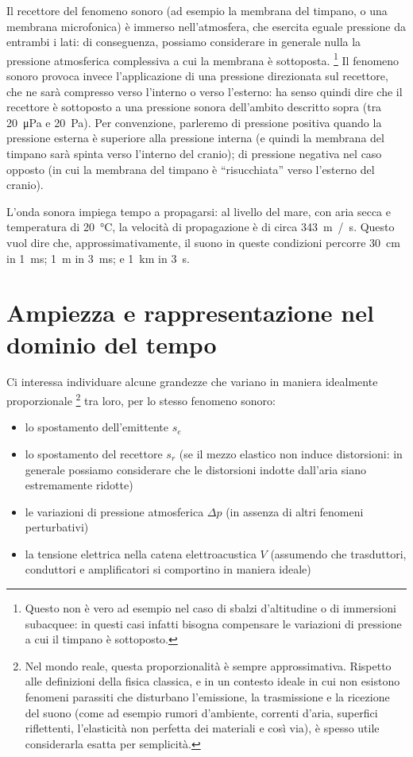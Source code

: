 Il recettore del fenomeno sonoro (ad esempio la membrana del timpano, o una membrana microfonica) è immerso nell'atmosfera, che esercita eguale pressione da entrambi i lati: di conseguenza, possiamo considerare in generale nulla la pressione atmosferica complessiva a cui la membrana è sottoposta.%
\footnote{Questo non è vero ad esempio nel caso di sbalzi d'altitudine o di immersioni subacquee: in questi casi infatti bisogna compensare le variazioni di pressione a cui il timpano è sottoposto.}
Il fenomeno sonoro provoca invece l'applicazione di una pressione direzionata sul recettore, che ne sarà compresso verso l'interno o verso l'esterno: ha senso quindi dire che il recettore è sottoposto a una pressione sonora dell'ambito descritto sopra (tra \qty{20}{\micro\pascal} e \qty{20}{\pascal}). Per convenzione, parleremo di pressione positiva quando la pressione esterna è superiore alla pressione interna (e quindi la membrana del timpano sarà spinta verso l'interno del cranio); di pressione negativa nel caso opposto (in cui la membrana del timpano è ``risucchiata'' verso l'esterno del cranio).

L'onda sonora impiega tempo a propagarsi: al livello del mare, con aria secca e temperatura di \qty{20}{\celsius}, la velocità di propagazione è di circa \qty{343}{m / s}. Questo vuol dire che, approssimativamente, il suono in queste condizioni percorre \qty{30}{cm} in \qty{1}{ms}; \qty{1}{m} in \qty{3}{ms}; e \qty{1}{km} in \qty{3}{s}.



\section{Ampiezza e rappresentazione nel dominio del tempo}

Ci interessa individuare alcune grandezze che variano in maniera idealmente proporzionale%
\footnote{Nel mondo reale, questa proporzionalità è sempre approssimativa. Rispetto alle definizioni della fisica classica, e in un contesto ideale in cui non esistono fenomeni parassiti che disturbano l'emissione, la trasmissione e la ricezione del suono (come ad esempio rumori d'ambiente, correnti d'aria, superfici riflettenti, l'elasticità non perfetta dei materiali e così via), è spesso utile considerarla esatta per semplicità.}
tra loro, per lo stesso fenomeno sonoro:

\begin{itemize}
\item lo spostamento dell'emittente $s_e$
\item lo spostamento del recettore $s_r$ (se il mezzo elastico non induce distorsioni: in generale possiamo considerare che le distorsioni indotte dall'aria siano estremamente ridotte)
\item le variazioni di pressione atmosferica $\Delta p$ (in assenza di altri fenomeni perturbativi)
\item la tensione elettrica nella catena elettroacustica $V$ (assumendo che trasduttori, conduttori e amplificatori si comportino in maniera ideale)
\end{itemize}

